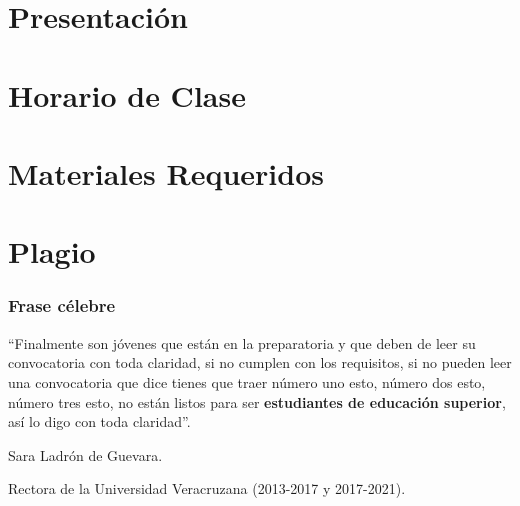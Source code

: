 \documentclass[aspectratio=169]{beamer}
\title[\abreviaturaNombreMateria]{\nombreMateria} %
\author{Dr. Marco Aurelio Nuño Maganda} %
\institute[UPV] %
{
Universidad Politecnica de Victoria \\ %
Ingenieria en Tecnologias de la Informacion \\ %
Cuatrimestre \cuatrimestre  \\ %
\medskip
\textit{mnunom@upv.edu.mx} %
}
\date{\today} %
\begin{document}
\begin{frame}
\titlepage %
\end{frame}




\section{Presentación} 



\section{Horario de Clase}

%

















%




\section{Materiales Requeridos}
%




\section{Plagio}




\begin{frame}
\frametitle{Frase célebre}
``Finalmente son jóvenes que están en la preparatoria y que deben de leer su convocatoria con toda claridad, si no cumplen con los requisitos, si no pueden leer una convocatoria que dice tienes que traer número uno esto, número dos esto, número tres esto, no están listos para ser \textbf{estudiantes de educación superior}, así lo digo con toda claridad''.

Sara Ladrón de Guevara.

Rectora de la Universidad Veracruzana (2013-2017 y 2017-2021).

\end{frame}





\end{document}
